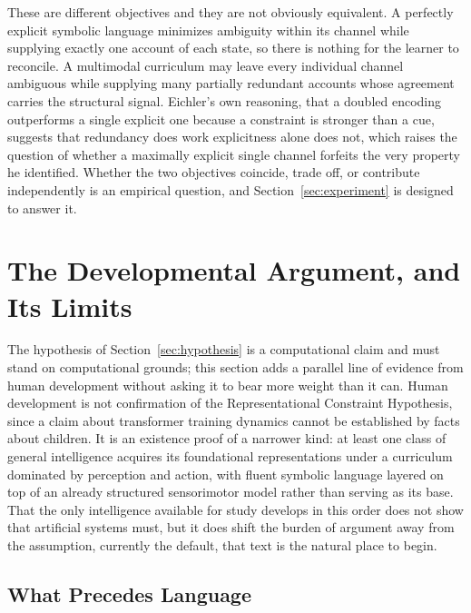 \documentclass[11pt]{article}
\begin{document}
These are different objectives and they are not obviously equivalent. A perfectly explicit symbolic language minimizes ambiguity within its channel while supplying exactly one account of each state, so there is nothing for the learner to reconcile. A multimodal curriculum may leave every individual channel ambiguous while supplying many partially redundant accounts whose agreement carries the structural signal. Eichler's own reasoning, that a doubled encoding outperforms a single explicit one because a constraint is stronger than a cue, suggests that redundancy does work explicitness alone does not, which raises the question of whether a maximally explicit single channel forfeits the very property he identified. Whether the two objectives coincide, trade off, or contribute independently is an empirical question, and Section~\ref{sec:experiment} is designed to answer it.


\section{The Developmental Argument, and Its Limits}
\label{sec:development}

The hypothesis of Section~\ref{sec:hypothesis} is a computational claim and must stand on computational grounds; this section adds a parallel line of evidence from human development without asking it to bear more weight than it can. Human development is not confirmation of the Representational Constraint Hypothesis, since a claim about transformer training dynamics cannot be established by facts about children. It is an existence proof of a narrower kind: at least one class of general intelligence acquires its foundational representations under a curriculum dominated by perception and action, with fluent symbolic language layered on top of an already structured sensorimotor model rather than serving as its base. That the only intelligence available for study develops in this order does not show that artificial systems must, but it does shift the burden of argument away from the assumption, currently the default, that text is the natural place to begin.

\subsection{What Precedes Language}
\end{document}
